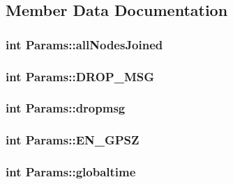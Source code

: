 \subsection{\-Member \-Data \-Documentation}
\hypertarget{class_params_a492930a2987db99094640813eba1deff}{
\subsubsection[{all\-Nodes\-Joined}]{\setlength{\rightskip}{0pt plus 5cm}int {\bf \-Params\-::all\-Nodes\-Joined}}}\label{dc/d1d/class_params_a492930a2987db99094640813eba1deff}
\hypertarget{class_params_a6e254d50de368dd9acd255c41178863f}{
\subsubsection[{\-D\-R\-O\-P\-\_\-\-M\-S\-G}]{\setlength{\rightskip}{0pt plus 5cm}int {\bf \-Params\-::\-D\-R\-O\-P\-\_\-\-M\-S\-G}}}\label{dc/d1d/class_params_a6e254d50de368dd9acd255c41178863f}
\hypertarget{class_params_ad57a790f4419c53a8e151d1e2e413454}{
\subsubsection[{dropmsg}]{\setlength{\rightskip}{0pt plus 5cm}int {\bf \-Params\-::dropmsg}}}\label{dc/d1d/class_params_ad57a790f4419c53a8e151d1e2e413454}
\hypertarget{class_params_ab60075ee5e58043a7bbc4d109f392ab4}{
\subsubsection[{\-E\-N\-\_\-\-G\-P\-S\-Z}]{\setlength{\rightskip}{0pt plus 5cm}int {\bf \-Params\-::\-E\-N\-\_\-\-G\-P\-S\-Z}}}\label{dc/d1d/class_params_ab60075ee5e58043a7bbc4d109f392ab4}
\hypertarget{class_params_ae261b965535fa59464980c03e521a554}{
\subsubsection[{globaltime}]{\setlength{\rightskip}{0pt plus 5cm}int {\bf \-Params\-::globaltime}}}\label{dc/d1d/class_params_ae261b965535fa59464980c03e521a554}
